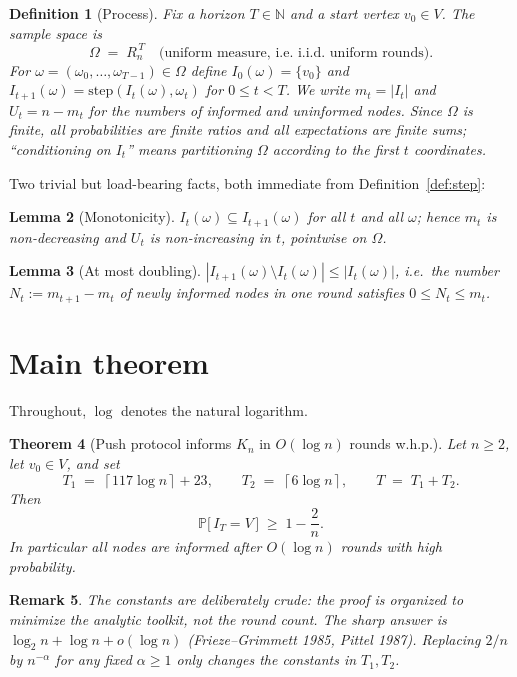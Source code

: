 \documentclass[11pt]{article}
\newtheorem{theorem}{Theorem}[section]
\newtheorem{lemma}[theorem]{Lemma}
\newtheorem{definition}[theorem]{Definition}
\newtheorem{remark}[theorem]{Remark}
\renewcommand{\Pr}{\mathbb{P}}
\newcommand{\N}{\mathbb{N}}
\newcommand{\ceil}[1]{\left\lceil #1 \right\rceil}
\begin{document}
\begin{definition}[Process]\label{def:process}
Fix a horizon $T \in \N$ and a start vertex $v_0 \in V$. The sample space is
\[
  \Omega \;=\; R_n^{\,T}
  \quad\text{(uniform measure, i.e.\ i.i.d.\ uniform rounds).}
\]
For $\omega = (\omega_0,\dots,\omega_{T-1}) \in \Omega$ define
$I_0(\omega) = \{v_0\}$ and
$I_{t+1}(\omega) = \mathrm{step}(I_t(\omega), \omega_t)$ for $0 \le t < T$.
We write $m_t = |I_t|$ and $U_t = n - m_t$ for the numbers of informed and
uninformed nodes.  Since $\Omega$ is finite, all probabilities are finite
ratios and all expectations are finite sums; ``conditioning on
$I_t$'' means partitioning $\Omega$ according to the first $t$ coordinates.
\end{definition}

Two trivial but load-bearing facts, both immediate from
Definition~\ref{def:step}:

\begin{lemma}[Monotonicity]\label{lem:mono}
$I_t(\omega) \subseteq I_{t+1}(\omega)$ for all $t$ and all $\omega$; hence
$m_t$ is non-decreasing and $U_t$ is non-increasing in $t$, pointwise on
$\Omega$.
\end{lemma}

\begin{lemma}[At most doubling]\label{lem:atmost}
$|I_{t+1}(\omega) \setminus I_t(\omega)| \le |I_t(\omega)|$, i.e.\ the number
$N_t := m_{t+1}-m_t$ of newly informed nodes in one round satisfies
$0 \le N_t \le m_t$.
\end{lemma}

\section{Main theorem}

Throughout, $\log$ denotes the natural logarithm.

\begin{theorem}[Push protocol informs $K_n$ in $O(\log n)$ rounds w.h.p.]
\label{thm:main}
Let $n \ge 2$, let $v_0 \in V$, and set
\[
  T_1 \;=\; \ceil{117 \log n} + 23, \qquad
  T_2 \;=\; \ceil{6 \log n}, \qquad
  T \;=\; T_1 + T_2 .
\]
Then
\[
  \Pr\bigl[\, I_T = V \,\bigr] \;\ge\; 1 - \frac{2}{n}.
\]
In particular all nodes are informed after $O(\log n)$ rounds with high
probability.
\end{theorem}

\begin{remark}
The constants are deliberately crude: the proof is organized to minimize the
analytic toolkit, not the round count.  The sharp answer is
$\log_2 n + \log n + o(\log n)$ (Frieze--Grimmett 1985, Pittel 1987).
Replacing $2/n$ by $n^{-\alpha}$ for any fixed $\alpha \ge 1$ only changes the
constants in $T_1, T_2$.
\end{remark}
\end{document}

